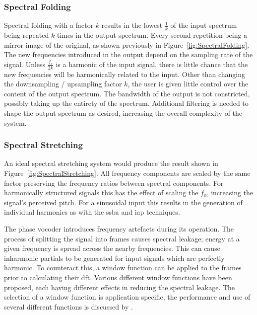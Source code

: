 		\subsubsection*{Spectral Folding}
			Spectral folding with a factor $k$ results in the lowest $\frac{1}{k}$ of the input spectrum being
			repeated $k$ times in the output spectrum. Every second repetition being a mirror image of the
			original, as shown previously in Figure~\ref{fig:SpectralFolding}. The new frequencies introduced
			in the output depend on the sampling rate of the signal. Unless $\frac{f_{s}}{2k}$ is a harmonic of
			the input signal, there is little chance that the new frequencies will be harmonically related to
			the input. Other than changing the downsampling / upsampling factor $k$, the user is given little
			control over the content of the output spectrum.  The bandwidth of the output is not constricted,
			possibly taking up the entirety of the spectrum.  Additional filtering is needed to shape the
			output spectrum as desired, increasing the overall complexity of the system.

		\subsubsection*{Spectral Stretching}
			An ideal spectral stretching system would produce the result shown in
			Figure~\ref{fig:SpectralStretching}. All frequency components are scaled by the same factor
			preserving the frequency ratios between spectral components. For harmonically structured signals
			this has the effect of scaling the $f_{0}$, increasing the signal's perceived pitch. For a
			sinusoidal input this results in the generation of individual harmonics as with the \acrshort{ssba}
			and \acrshort{iap} techniques.
			
			The phase vocoder introduces frequency artefacts during its operation. The process of splitting the
			signal into frames causes spectral leakage; energy at a given frequency is spread across the nearby
			frequencies. This can cause inharmonic partials to be generated for input signals which are
			perfectly harmonic. To counteract this, a window function can be applied to the frames prior to
			calculating their \acrshort{dft}. Various different window functions have been proposed, each
			having different effects in reducing the spectral leakage. The selection of a window function is
			application specific, the performance and use of several different functions is discussed by
			\citet{harris1978on}.
			
